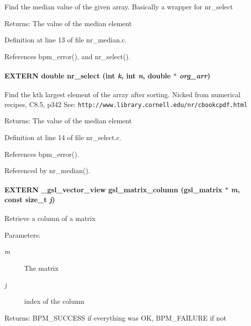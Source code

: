 Find the median value of the given array. Basically a wrapper for nr\_\-select

\begin{Desc}
\item[Returns:]The value of the median element \end{Desc}


Definition at line 13 of file nr\_\-median.c.

References bpm\_\-error(), and nr\_\-select().
\paragraph[nr\_\-select]{\setlength{\rightskip}{0pt plus 5cm}EXTERN double nr\_\-select (int {\em k}, \/  int {\em n}, \/  double $\ast$ {\em org\_\-arr})}\hfill\label{group__nr_g99dfdcb29cf87de95b3e22ad9b81297f}


Find the kth largest element of the array after sorting. Nicked from numerical recipes, C8.5, p342 See: {\tt http://www.library.cornell.edu/nr/cbookcpdf.html}

\begin{Desc}
\item[Returns:]The value of the median element \end{Desc}


Definition at line 14 of file nr\_\-select.c.

References bpm\_\-error().

Referenced by nr\_\-median().
\paragraph[gsl\_\-matrix\_\-column]{\setlength{\rightskip}{0pt plus 5cm}EXTERN \_\-gsl\_\-vector\_\-view gsl\_\-matrix\_\-column (gsl\_\-matrix $\ast$ {\em m}, \/  const size\_\-t {\em j})}\hfill\label{group__nr_gb44015e0db3d57798a8b6ad6961ff042}


Retrieve a column of a matrix

\begin{Desc}
\item[Parameters:]
\begin{description}
\item[{\em m}]The matrix \item[{\em j}]index of the column\end{description}
\end{Desc}
\begin{Desc}
\item[Returns:]BPM\_\-SUCCESS if everything was OK, BPM\_\-FAILURE if not \end{Desc}



